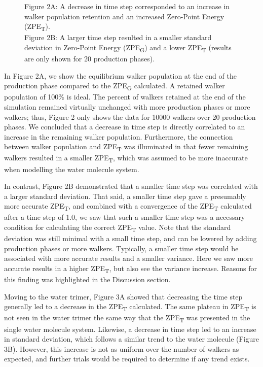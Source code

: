 \documentclass[journal=jacsat,manuscript=article]{achemso}
\begin{document}
\begin{figure}[H]
\begin{subfigure}{.5\textwidth}
\end{subfigure}
\caption{Figure 2A: A decrease in time step corresponded to an increase in walker population retention and an increased Zero-Point Energy (ZPE\textsubscript{T}).\\ 
Figure 2B: A larger time step resulted in a smaller standard deviation in Zero-Point Energy (ZPE\textsubscript{G}) and a lower ZPE\textsubscript{T} (results are only shown for 20 production phases).}
\end{figure}

In Figure 2A, we show the equilibrium walker population at the end of the production phase compared to the ZPE\textsubscript{G} calculated. A retained walker population of 100\% is ideal. The percent of walkers retained at the end of the simulation remained virtually unchanged with more production phases or more walkers; thus, Figure 2 only shows the data for 10000 walkers over 20 production phases. We concluded that a decrease in time step is directly correlated to an increase in the remaining walker population. Furthermore, the connection between walker population and ZPE\textsubscript{T} was illuminated in that fewer remaining walkers resulted in a smaller ZPE\textsubscript{T}, which was assumed to be more inaccurate when modelling the water molecule system. 

In contrast, Figure 2B demonstrated that a smaller time step was correlated with a larger standard deviation. That said, a smaller time step gave a presumably more accurate ZPE\textsubscript{T}, and combined with a convergence of the ZPE\textsubscript{T} calculated after a time step of 1.0, we saw that such a smaller time step was a necessary condition for calculating the correct ZPE\textsubscript{T} value. Note that the standard deviation was still minimal with a small time step, and can be lowered by adding production phases or more walkers. Typically, a smaller time step would be associated with more accurate results and a smaller variance. Here we saw more accurate results in a higher ZPE\textsubscript{T}, but also see the variance increase. Reasons for this finding was highlighted in the Discussion section.

Moving to the water trimer, Figure 3A showed that decreasing the time step generally led to a decrease in the ZPE\textsubscript{T} calculated. The same plateau in ZPE\textsubscript{T} is not seen in the water trimer the same way that the ZPE\textsubscript{T} was presented in the single water molecule system. Likewise, a decrease in time step led to an increase in standard deviation, which follows a similar trend to the water molecule (Figure 3B). However, this increase is not as uniform over the number of walkers as expected, and further trials would be required to determine if any trend exists. 
\end{document}
